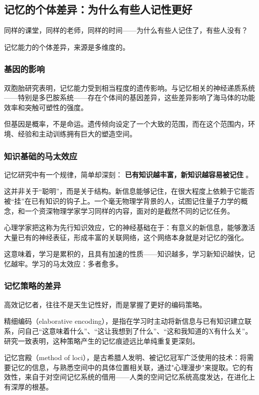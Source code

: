 \documentclass[11pt]{article}
\begin{document}
\subsection{记忆的个体差异：为什么有些人记性更好}
\label{sec:orgdf70d6a}

同样的课堂，同样的老师，同样的时间——为什么有些人记住了，有些人没有？

记忆能力的个体差异，来源是多维度的。
\subsubsection{基因的影响}
\label{sec:org52a4035}

双胞胎研究表明，记忆能力受到相当程度的遗传影响。与记忆相关的神经递质系统——特别是多巴胺系统——存在个体间的基因差异，这些差异影响了海马体的功能效率和突触可塑性的强度。

但基因是概率，不是命运。遗传倾向设定了一个大致的范围，而在这个范围内，环境、经验和主动训练拥有巨大的塑造空间。
\subsubsection{知识基础的马太效应}
\label{sec:org5064693}

记忆研究中有一个规律，简单却深刻： \textbf{已有知识越丰富，新知识越容易被记住} 。

这并非关于“聪明”，而是关于结构。新信息能够记住，在很大程度上依赖于它能否被“挂”在已有知识的钩子上。一个毫无物理学背景的人，试图记住量子力学的概念，和一个资深物理学家学习同样的内容，面对的是截然不同的记忆任务。

心理学家把这称为先行知识效应，它的神经基础在于：有意义的新信息，能够激活大量已有的神经表征，形成丰富的关联网络，这个网络本身就是对记忆的强化。

这意味着，学习是累积的，且具有加速的性质——知识越多，学习新知识越快，记忆越牢。学习的马太效应：多者愈多。
\subsubsection{记忆策略的差异}
\label{sec:org90e63f2}

高效记忆者，往往不是天生记性好，而是掌握了更好的编码策略。

精细编码（elaborative encoding），是指在学习时主动将新信息与已有知识建立联系，问自己“这意味着什么”、“这让我想到了什么”、“这和我知道的X有什么关”。研究一致表明，这种策略产生的记忆痕迹远比单纯重复更深刻。

记忆宫殿（method of loci），是古希腊人发明、被记忆冠军广泛使用的技术：将需要记忆的信息，与熟悉空间中的具体位置相关联，通过"心理漫步"来提取。它的有效性，来自于对空间记忆系统的借用——人类的空间记忆系统高度发达，在进化上有深厚的根基。
\end{document}
